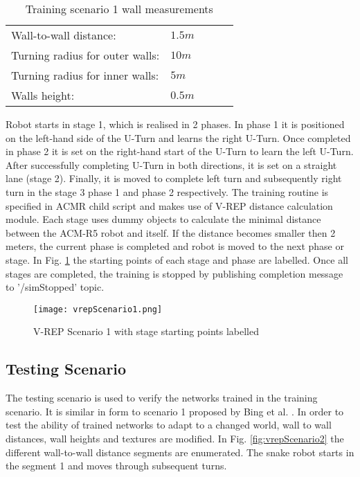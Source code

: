 \begin{table}[h]
	\centering
	\caption{Training scenario 1 wall measurements}
	\begin{tabular}{lllll}
		\cline{1-2}
		 Wall-to-wall distance:&  \(1.5 m\)&  \\ 
		 Turning radius for outer walls:&  \(10 m\)&  \\
		 Turning radius for inner walls:&  \(5 m\)&  \\
		 Walls height:& \(0.5 m\)&\\
		\cline{1-2}
	\end{tabular}
\label{tableTrainingScenario1}
\end{table}


Robot starts in stage 1, which is realised in 2 phases. In phase 1 it is positioned on the left-hand side of the U-Turn and learns the right U-Turn. Once completed in phase 2 it is set on the right-hand start of the U-Turn to learn the left U-Turn. After successfully completing U-Turn in both directions, it is set on a straight lane (stage 2). Finally, it is moved to complete left turn and subsequently right turn in the stage 3 phase 1 and phase 2 respectively.  The training routine is specified in ACMR child script and makes use of V-REP distance calculation module. Each stage uses dummy objects to calculate the minimal distance between the ACM-R5 robot and itself. If the distance becomes smaller then 2 meters, the current phase is completed and robot is moved to the next phase or stage. In Fig. \ref{fig:vrepScenario1} the starting points of each stage and phase are labelled. Once all stages are completed, the training is stopped by publishing completion message to '/simStopped' topic.

\begin{figure}[h]
	\begin{center}
		\texttt{[image: vrepScenario1.png]}
		\caption{V-REP Scenario 1 with stage starting points labelled \label{fig:vrepScenario1}}  
	\end{center}
\end{figure}

\subsection{Testing Scenario}
The testing scenario is used to verify the networks trained in the training scenario. It is similar in form to scenario 1 proposed by Bing et al. \cite{8}. In order to test the ability of trained networks to adapt to a changed world, wall to wall distances, wall heights and textures are modified. In Fig. \ref{fig:vrepScenario2} the different wall-to-wall distance segments are enumerated. The snake robot starts in the segment 1 and moves through subsequent turns.  


